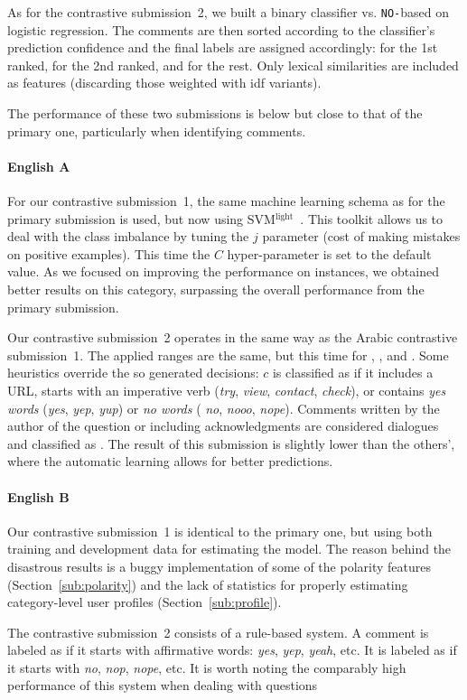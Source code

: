 As for the contrastive submission~2, we built a binary classifier \dir vs. 
\texttt{NO-}\dir based on logistic regression. The comments are then sorted 
according to the classifier's prediction confidence and the final labels are 
assigned accordingly: \dir for the 1st ranked, \rel for the 2nd ranked, and 
\irel for the rest. Only lexical similarities are included as features 
(discarding those weighted with idf variants).


The performance of these two submissions is below but close to that of the 
primary one, particularly when identifying \rel comments. 

\paragraph{English A}

For our contrastive submission~1, the same machine learning schema as for the 
primary submission is used, but now using 
SVM$^\mathrm{light}$~\cite{Joachims:99}. This toolkit allows us to deal with 
the class imbalance by tuning the $j$ parameter (cost of making mistakes on 
positive examples). This time the $C$ hyper-parameter is set to the default 
value. As we focused on improving the performance on \pot instances, we 
obtained better results on this category, surpassing the overall performance 
from the primary submission.

Our contrastive submission~2 operates in the same way as the Arabic contrastive 
submission~1. The applied ranges are the same, but this time for \good, \pot, 
and \bad. Some heuristics override the so generated decisions: $c$ is classified 
as \good if it includes a URL, starts with an imperative verb (\eg \textit{try}, 
\textit{view}, \textit{contact}, \textit{check}), or contains \textit{yes words} 
(\eg \textit{yes}, \textit{yep}, \textit{yup}) or \textit{no words} (\eg 
\textit{no}, \textit{nooo}, \textit{nope}). Comments written by the author of 
the question or including acknowledgments are considered dialogues and 
classified as \bad. The result of this submission is slightly lower than the 
others', where the automatic learning allows for better predictions.

\paragraph{English B}

Our contrastive submission~1 is identical to the primary one, but using both 
training and development data for estimating the model. The reason behind the 
disastrous results is a buggy implementation of some of the polarity features 
(\cf Section~\ref{sub:polarity}) and the lack of statistics for properly 
estimating category-level user profiles (\cf Section~\ref{sub:profile}). 
 
 
The contrastive submission~2 consists of a rule-based system. A comment is 
labeled as \yes if it starts with affirmative words: \textit{yes}, \textit{yep}, 
\textit{yeah}, etc. It is labeled as \no if it starts with \textit{no}, 
\textit{nop}, \textit{nope}, etc. It is worth noting the comparably high 
performance of this system when dealing with \unsure questions 

